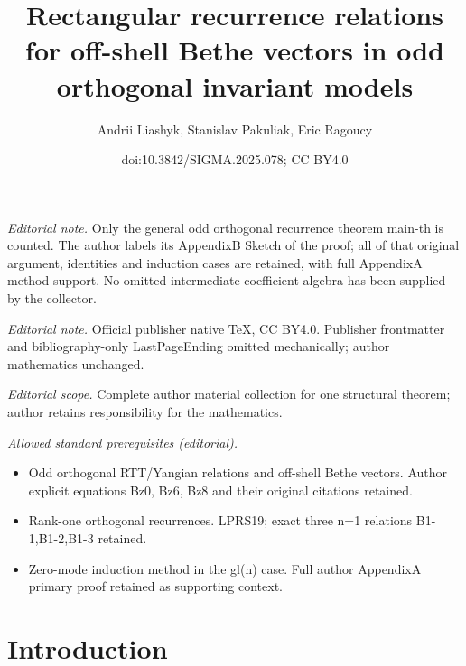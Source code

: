 \documentclass[10pt,a4paper]{amsart}
\title{Rectangular recurrence relations for off-shell Bethe vectors in odd orthogonal invariant models}
\author{Andrii Liashyk, Stanislav Pakuliak, Eric Ragoucy}
\date{doi:10.3842/SIGMA.2025.078; CC BY4.0}
\theoremstyle{definition}
\begin{document}
\maketitle
\noindent\textit{Editorial note.} Only the general odd orthogonal recurrence theorem main-th is counted. The author labels its AppendixB Sketch of the proof; all of that original argument, identities and induction cases are retained, with full AppendixA method support. No omitted intermediate coefficient algebra has been supplied by the collector.\par\medskip
\noindent\textit{Editorial note.} Official publisher native TeX, CC BY4.0. Publisher frontmatter and bibliography-only LastPageEnding omitted mechanically; author mathematics unchanged.\par\medskip
\noindent\textit{Editorial scope.} Complete author material collection for one structural theorem; author retains responsibility for the mathematics.\par\medskip
\noindent\textit{Allowed standard prerequisites (editorial).}\begin{itemize}
\item Odd orthogonal RTT/Yangian relations and off-shell Bethe vectors. Author explicit equations Bz0, Bz6, Bz8 and their original citations retained.
\item Rank-one orthogonal recurrences. LPRS19; exact three n=1 relations B1-1,B1-2,B1-3 retained.
\item Zero-mode induction method in the gl(n) case. Full author AppendixA primary proof retained as supporting context.
\end{itemize}\medskip
\section{Introduction}
\end{document}

